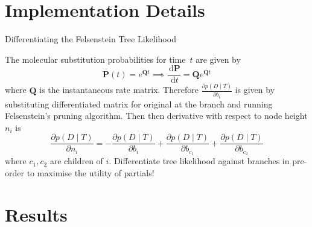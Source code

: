 \documentclass{beamer}
\newcommand{\dd}{\, \text{d}}
\newcommand{\mat}[1]{\ensuremath{\mathbf{#1}}}
\begin{document}
    \section{Implementation Details}

    \begin{frame}{Differentiating the Felsenstein Tree Likelihood}

        The molecular substitution probabilities for time~$t$ are given by
        \begin{equation*}
            \mat{P}\left(t\right) = e^{\mat{Q}t} \implies \frac{\dd \mat{P}}{\dd t} = \mat{Q}e^{\mat{Q}t}
        \end{equation*}
        where $\mat{Q}$ is the instantaneous rate matrix.
        Therefore $\frac{\partial p\left(D\mid T\right)}{\partial b_i}$ is given by substituting differentiated matrix for original at the branch and running Felsenstein's pruning algorithm.
        Then then derivative with respect to node height $n_i$ is
        \begin{equation*}
            \frac{\partial p\left(D\mid T\right)}{\partial n_i} = - \frac{\partial p\left(D\mid T\right)}{\partial b_i} + \frac{\partial p\left(D\mid T\right)}{\partial b_{c_1}} + \frac{\partial p\left(D\mid T\right)}{\partial b_{c_2}}
        \end{equation*}
        where $c_1,c_2$ are children of $i$.
        Differentiate tree likelihood against branches in pre-order to maximise the utility of partials!

    \end{frame}

    \section{Results}

\end{document}
